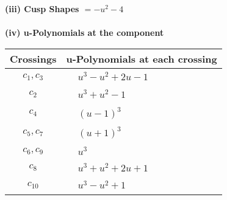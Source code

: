 \documentclass[1p]{elsarticle_modified}
\theoremstyle{definition}
\begin{document}
\flushleft \textbf{(iii) Cusp Shapes $= - u^2-4$}\\~\\
\newpage\renewcommand{\arraystretch}{1}
\flushleft \textbf{(iv) u-Polynomials at the component}\newline \\
\begin{tabular}{m{50pt}|m{274pt}}
Crossings & \hspace{64pt}u-Polynomials at each crossing \\
\hline $$\begin{aligned}c_{1},c_{3}\end{aligned}$$&$\begin{aligned}
&u^3- u^2+2 u-1
\end{aligned}$\\
\hline $$\begin{aligned}c_{2}\end{aligned}$$&$\begin{aligned}
&u^3+u^2-1
\end{aligned}$\\
\hline $$\begin{aligned}c_{4}\end{aligned}$$&$\begin{aligned}
&(u-1)^3
\end{aligned}$\\
\hline $$\begin{aligned}c_{5},c_{7}\end{aligned}$$&$\begin{aligned}
&(u+1)^3
\end{aligned}$\\
\hline $$\begin{aligned}c_{6},c_{9}\end{aligned}$$&$\begin{aligned}
&u^3
\end{aligned}$\\
\hline $$\begin{aligned}c_{8}\end{aligned}$$&$\begin{aligned}
&u^3+u^2+2 u+1
\end{aligned}$\\
\hline $$\begin{aligned}c_{10}\end{aligned}$$&$\begin{aligned}
&u^3- u^2+1
\end{aligned}$\\
\hline
\end{tabular}\\~\\
\end{document}
